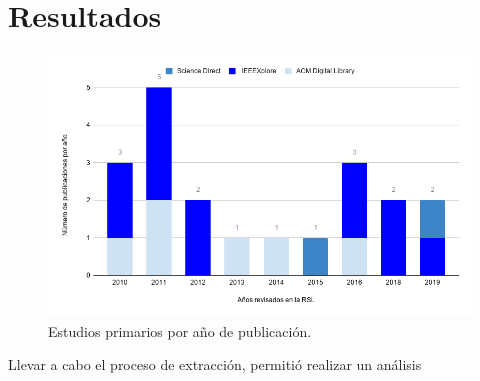 \documentclass[conference,onecolumn,10pt]{IEEEtran}
\begin{document}
\section{Resultados}

\begin{figure}[!htb]
   \includegraphics[width=\linewidth]{chart.png}
   \caption{Estudios primarios por año de publicación.}
   \label{fig:estudiostotales}
\end{figure}

Llevar a cabo el proceso de extracción, permitió realizar un análisis 
\end{document}
